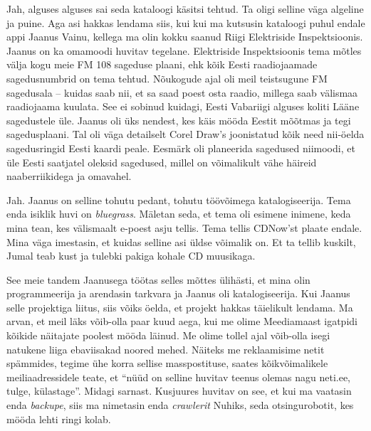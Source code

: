 Jah, alguses alguses sai seda kataloogi käsitsi tehtud. Ta oligi selline väga 
algeline ja puine. Aga asi hakkas lendama siis, kui kui ma kutsusin kataloogi 
puhul endale appi Jaanus Vainu, kellega ma olin kokku 
saanud Riigi Elektriside Inspektsioonis. 
Jaanus on ka omamoodi huvitav tegelane. Elektriside Inspektsioonis tema mõtles 
välja kogu meie FM 108 sageduse plaani, ehk kõik Eesti raadiojaamade 
sagedusnumbrid on tema tehtud. Nõukogude ajal oli meil teistsugune FM 
sagedusala -- kuidas saab nii, et sa saad poest osta raadio, millega saab 
välismaa raadiojaama kuulata. See ei sobinud kuidagi, Eesti Vabariigi alguses 
koliti Lääne sagedustele üle. Jaanus oli üks nendest, kes käis mööda Eestit  
mõõtmas ja tegi sagedusplaani. Tal oli väga detailselt Corel Draw's joonistatud kõik need nii-öelda sagedusringid Eesti kaardi peale. Eesmärk 
oli  planeerida sagedused niimoodi, et üle Eesti saatjatel oleksid sagedused, 
millel on võimalikult vähe häireid naaberriikidega ja omavahel.  


Jah. Jaanus on selline tohutu pedant,  tohutu  töövõimega katalogiseerija. 
Tema enda isiklik huvi on \emph{bluegrass}. Mäletan seda, et tema oli esimene 
inimene, keda mina tean, kes välismaalt e-poest asju tellis.  Tema tellis 
CDNow'st  plaate endale. Mina väga imestasin, et kuidas selline asi üldse 
võimalik on. Et ta tellib kuskilt, Jumal teab kust ja tulebki pakiga kohale CD 
muusikaga.


See meie tandem Jaanusega töötas selles mõttes ülihästi, et mina olin  
programmeerija ja arendasin tarkvara ja Jaanus oli  katalogiseerija.  Kui Jaanus 
selle projektiga liitus, siis võiks öelda, et projekt hakkas täielikult 
lendama. Ma arvan, et meil läks võib-olla paar kuud aega, kui me olime 
Meediamaast igatpidi kõikide näitajate poolest mööda läinud. 
Me olime tollel ajal võib-olla isegi natukene liiga ebaviisakad noored mehed. 
Näiteks me reklaamisime netit spämmides, tegime  ühe korra sellise 
masspostituse, saates kõikvõimalikele meiliaadressidele teate, et \enquote{nüüd 
on selline huvitav teenus olemas nagu neti.ee, tulge, külastage}. Midagi 
sarnast. Kusjuures huvitav on see, et kui ma vaatasin enda \emph{backupe}, siis 
ma nimetasin enda \emph{crawlerit} Nuhiks, seda otsingurobotit, kes mööda lehti 
ringi kolab. 

